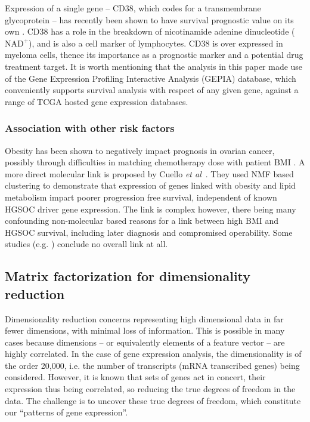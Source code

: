 \documentclass[tikz, 12pt,a4paper,oneside,fleqn]{article}
\newcommand{\etal}{{\em et al\/}}
\begin{document}
Expression of a single gene -- CD38, which codes for a transmembrane glycoprotein -- has recently been shown to have survival prognostic value on its own \cite{Zhu2020}.
CD38 has a role in the breakdown of nicotinamide adenine dinucleotide ($\mbox{NAD}^+$), and is also a cell marker of lymphocytes.
CD38 is over expressed in myeloma cells, thence its importance as a prognostic marker and a potential drug treatment target.  
It is worth mentioning that the analysis in this paper made use of the Gene Expression Profiling Interactive Analysis (GEPIA) database, which conveniently supports survival analysis with respect of any given gene, against a range of TCGA hosted gene expression databases.

\subsubsection{Association with other risk factors}

Obesity has been shown to negatively impact prognosis in ovarian cancer, possibly through difficulties in matching chemotherapy dose with patient BMI  \cite{Au-Yeung2014}.  A more direct molecular link is proposed by Cuello \etal\ \cite{Cuello2018}.  They used NMF based clustering to demonstrate that expression of genes linked with obesity and lipid metabolism impart poorer progression free survival, independent of known HGSOC driver gene expression.  The link is complex however, there being many confounding non-molecular based reasons for a link between high BMI and HGSOC survival, including later diagnosis and compromised operability.  Some studies (e.g. \cite{Hew2013}) conclude no overall link at all.


\subsection{Matrix factorization for dimensionality reduction}
\label{sec-matrix-factorization-intro}

Dimensionality reduction concerns representing high dimensional data in far fewer dimensions, with minimal loss of information.  This is possible in many cases because dimensions -- or equivalently elements of a feature vector -- are highly correlated.  In the case of gene expression analysis, the dimensionality is of the order 20,000, i.e. the number of transcripts (mRNA transcribed genes) being considered.  However, it is known that sets of genes act in concert, their expression thus being correlated, so reducing the true degrees of freedom in the data.  The challenge is to uncover these true degrees of freedom, which constitute our ``patterns of gene expression''.
\end{document}
